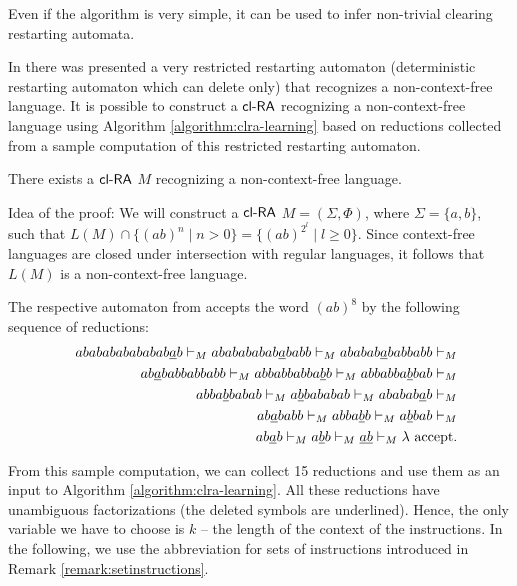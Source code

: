 Even if the algorithm is very simple, it can be used to infer non-trivial clearing restarting automata.

In \cite{JMPV97} there was presented a very restricted restarting automaton (deterministic restarting automaton which can delete only) that recognizes a non-context-free language. It is possible to construct a $\textup{\sf cl-RA\/}$ recognizing a non-context-free language using Algorithm \ref{algorithm:clra-learning} based on reductions collected from a sample computation of this restricted restarting automaton.

\begin{theorem}\label{theorem:clRAnonCFL}
There exists a $\textup{\sf cl-RA\/}$ $M$ recognizing a non-context-free language.
\end{theorem}

Idea of the proof: We will construct a $\textup{\sf cl-RA\/}$ $M = (\Sigma, \Phi)$, where $\Sigma = \{a, b\}$, such that $L(M) \cap \{(ab)^n \mid n>0\} = \{(ab)^{2^l} \mid l \ge 0\}$. Since context-free languages are closed under intersection with regular languages, it follows that $L(M)$ is a non-context-free language.

The respective automaton from \cite{JMPV97} accepts the word $(ab)^8$ by the following sequence of reductions:
\begin{eqnarray*}
& & ababababababab\underline{a}b  \vdash_M
ababababab\underline{a}babb  \vdash_M
  ababab\underline{a}babbabb  \vdash_M\\
& & ab\underline{a}babbabbabb  \vdash_M
  abbabbabba\underline{b}b  \vdash_M
  abbabba\underline{b}bab  \vdash_M\\
& & abba\underline{b}babab  \vdash_M
  a\underline{b}bababab  \vdash_M
  ababab\underline{a}b  \vdash_M\\
& & ab\underline{a}babb  \vdash_M
  abba\underline{b}b  \vdash_M
  a\underline{b}bab  \vdash_M\\
& & ab\underline{a}b  \vdash_M
  a\underline{b}b  \vdash_M
  \underline{ab}  \vdash_M
  \lambda  \textup{ accept}.
\end{eqnarray*}

From this sample computation, we can collect 15 reductions and use them as an input to Algorithm \ref{algorithm:clra-learning}. All these reductions have unambiguous factorizations (the deleted symbols are underlined). Hence, the only variable we have to choose is $k$ -- the length of the context of the instructions. In the following, we use the abbreviation for sets of instructions introduced in Remark \ref{remark:setinstructions}.

